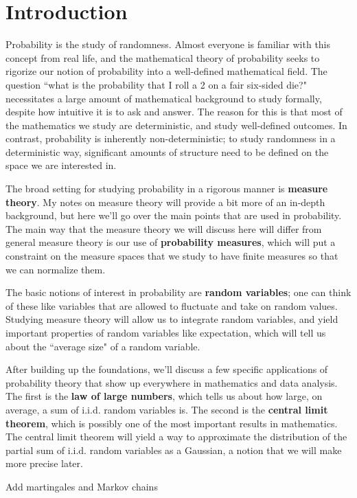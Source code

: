 \newpage
\section{Introduction}

Probability is the study of randomness. Almost everyone is familiar with this concept from real life, and the mathematical theory of probability seeks to rigorize our notion of probability into a well-defined mathematical field. The question ``what is the probability that I roll a 2 on a fair six-sided die?" necessitates a large amount of mathematical background to study formally, despite how intuitive it is to ask and answer. The reason for this is that most of the mathematics we study are deterministic, and study well-defined outcomes. In contrast, probability is inherently non-deterministic; to study randomness in a deterministic way, significant amounts of structure need to be defined on the space we are interested in. 

The broad setting for studying probability in a rigorous manner is \textbf{measure theory}. My notes on measure theory will provide a bit more of an in-depth background, but here we'll go over the main points that are used in probability. The main way that the measure theory we will discuss here will differ from general measure theory is our use of \textbf{probability measures}, which will put a constraint on the measure spaces that we study to have finite measures so that we can normalize them. 

The basic notions of interest in probability are \textbf{random variables}; one can think of these like variables that are allowed to fluctuate and take on random values. Studying measure theory will allow us to integrate random variables, and yield important properties of random variables like expectation, which will tell us about the ``average size" of a random variable. 

After building up the foundations, we'll discuss a few specific applications of probability theory that show up everywhere in mathematics and data analysis. The first is the \textbf{law of large numbers}, which tells us about how large, on average, a sum of i.i.d. random variables is. The second is the \textbf{central limit theorem}, which is possibly one of the most important results in mathematics. The central limit theorem will yield a way to approximate the distribution of the partial sum of i.i.d. random variables as a Gaussian, a notion that we will make more precise later. 

{\color{red}Add martingales and Markov chains}

